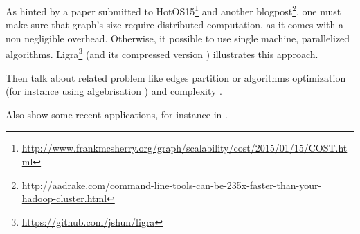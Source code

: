 As hinted by a paper submitted to
HotOS15\footnote{\href{http://www.frankmcsherry.org/graph/scalability/cost/2015/01/15/COST.html}%
	{http://www.frankmcsherry.org/graph/scalability/cost/2015/01/15/COST.html}}
and another
blogpost\footnote{\href{http://aadrake.com/command-line-tools-can-be-235x-faster-than-your-hadoop-cluster.html}%
	{http://aadrake.com/command-line-tools-can-be-235x-faster-than-your-hadoop-cluster.html}},
one must make sure that graph's size require distributed computation, as it
comes with a non negligible overhead. Otherwise, it possible to use single
machine, parallelized algorithms.
Ligra\footnote{\href{https://github.com/jshun/ligra}%
	{https://github.com/jshun/ligra}} \autocite{Ligra13} (and its compressed
version \autocite{Ligra15}) illustrates this approach.

Then talk about related problem like edges partition \autocite{Bourse2014a} or
algorithms optimization \autocites{Salihoglu14}{Salihoglu2014b} (for instance
using algebrisation \autocite{Kaski2014}) and complexity \autocite{Klauck2013}.

Also show some recent applications, for instance in \pcc{}
\autocites{Bonchi2012}{Chierichetti2014}.
\autocite{Quick2012}
